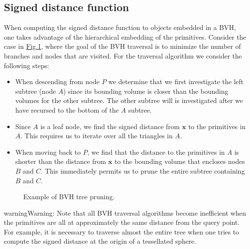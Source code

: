 \documentclass[letterpaper,10pt,english]{sphinxmanual}
\let\sphinxpxdimen\pdfpxdimen\else\newdimen\sphinxpxdimen
\begin{document}
\subsection{Signed distance function}
\label{\detokenize{BVH:signed-distance-function}}
\sphinxAtStartPar
When computing the signed distance function to objects embedded in a BVH, one takes advantage of the hierarchical embedding of the primitives.
Consider the case in \hyperref[\detokenize{BVH:fig-treepruning}]{Fig.\@ \ref{\detokenize{BVH:fig-treepruning}}}, where the goal of the BVH traversal is to minimize the number of branches and nodes that are visited.
For the traversal algorithm we consider the following steps:
\begin{itemize}
\item {} 
\sphinxAtStartPar
When descending from node \(P\) we determine that we first investigate the left subtree (node \(A\)) since its bounding volume is closer than the bounding volumes for the other subtree.
The other subtree will is investigated after we have recursed to the bottom of the \(A\) subtree.

\item {} 
\sphinxAtStartPar
Since \(A\) is a leaf node, we find the signed distance from \(\mathbf{x}\) to the primitives in \(A\).
This requires us to iterate over all the triangles in \(A\).

\item {} 
\sphinxAtStartPar
When moving back to \(P\), we find that the distance to the primitives in \(A\) is shorter than the distance from \(\mathbf{x}\) to the bounding volume that encloses nodes \(B\) and \(C\).
This immediately permits us to prune the entire subtree containing \(B\) and \(C\).

\end{itemize}

\begin{figure}[htbp]
\centering
\capstart

\noindent\sphinxincludegraphics[width=480\sphinxpxdimen]{{TreePruning}.png}
\caption{Example of BVH tree pruning.}\label{\detokenize{BVH:id2}}\label{\detokenize{BVH:fig-treepruning}}\end{figure}

\begin{sphinxadmonition}{warning}{Warning:}
\sphinxAtStartPar
Note that all BVH traversal algorithms become inefficient when the primitives are all at approximately the same distance from the query point.
For example, it is necessary to traverse almost the entire tree when one tries to compute the signed distance at the origin of a tessellated sphere.
\end{sphinxadmonition}
\end{document}
